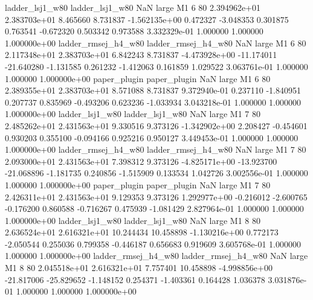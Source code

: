     ladder_lsj1_w80     ladder_lsj1_w80                   NaN      large       M1                 6 80 2.394962e+01   2.383703e+01      8.465660       8.731837 -1.562135e+00      0.472327     -3.048353     0.301875       0.763541 -0.672320   0.503342     0.973588   3.332329e-01            1.000000        1.000000        1.000000e+00
ladder_rmsej_h4_w80 ladder_rmsej_h4_w80                   NaN      large       M1                 6 80 2.117348e+01   2.383703e+01      6.842243       8.731837 -4.473928e+00    -11.174011    -21.640280    -1.131585       0.261232 -1.412063   0.161859     1.029522   3.063761e-01            1.000000        1.000000        1.000000e+00
       paper_plugin        paper_plugin                   NaN      large       M1                 6 80 2.389355e+01   2.383703e+01      8.571088       8.731837  9.372940e-01      0.237110     -1.840951     0.207737       0.835969 -0.493206   0.623236    -1.033934   3.043218e-01            1.000000        1.000000        1.000000e+00
    ladder_lsj1_w80     ladder_lsj1_w80                   NaN      large       M1                 7 80 2.485262e+01   2.431563e+01      9.330516       9.373126 -1.342902e+00      2.208427     -0.454601     0.930203       0.355100 -0.094166   0.925216     0.950127   3.449453e-01            1.000000        1.000000        1.000000e+00
ladder_rmsej_h4_w80 ladder_rmsej_h4_w80                   NaN      large       M1                 7 80 2.093000e+01   2.431563e+01      7.398312       9.373126 -4.825171e+00    -13.923700    -21.068896    -1.181735       0.240856 -1.515909   0.133534     1.042726   3.002556e-01            1.000000        1.000000        1.000000e+00
       paper_plugin        paper_plugin                   NaN      large       M1                 7 80 2.426311e+01   2.431563e+01      9.129353       9.373126  1.292977e+00     -0.216012     -2.600765    -0.176200       0.860588 -0.716267   0.475939    -1.081429   2.827964e-01            1.000000        1.000000        1.000000e+00
    ladder_lsj1_w80     ladder_lsj1_w80                   NaN      large       M1                 8 80 2.636524e+01   2.616321e+01     10.244434      10.458898 -1.130216e+00      0.772173     -2.050544     0.255036       0.799358 -0.446187   0.656683     0.919609   3.605768e-01            1.000000        1.000000        1.000000e+00
ladder_rmsej_h4_w80 ladder_rmsej_h4_w80                   NaN      large       M1                 8 80 2.045518e+01   2.616321e+01      7.757401      10.458898 -4.998856e+00    -21.817006    -25.829652    -1.148152       0.254371 -1.403361   0.164428     1.036378   3.031876e-01            1.000000        1.000000        1.000000e+00
